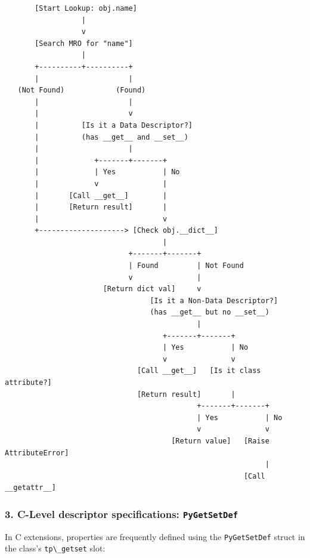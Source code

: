 \begin{lstlisting}
       [Start Lookup: obj.name]
                  |
                  v
       [Search MRO for "name"]
                  |
       +----------+----------+
       |                     |
   (Not Found)            (Found)
       |                     |
       |                     v
       |          [Is it a Data Descriptor?]
       |          (has __get__ and __set__)
       |                     |
       |             +-------+-------+
       |             | Yes           | No
       |             v               |
       |       [Call __get__]        |
       |       [Return result]       |
       |                             v
       +--------------------> [Check obj.__dict__]
                                     |
                             +-------+-------+
                             | Found         | Not Found
                             v               |
                       [Return dict val]     v
                                  [Is it a Non-Data Descriptor?]
                                  (has __get__ but no __set__)
                                             |
                                     +-------+-------+
                                     | Yes           | No
                                     v               v
                               [Call __get__]   [Is it class attribute?]
                               [Return result]       |
                                             +-------+-------+
                                             | Yes           | No
                                             v               v
                                       [Return value]   [Raise AttributeError]
                                                             |
                                                        [Call __getattr__]
\end{lstlisting}

\hypertarget{c-level-descriptor-specifications-pygetsetdef}{%
\subsubsection{\texorpdfstring{3. C-Level descriptor specifications:
\texttt{PyGetSetDef}}{3. C-Level descriptor specifications: PyGetSetDef}}\label{c-level-descriptor-specifications-pygetsetdef}}

In C extensions, properties are frequently defined using the
\passthrough{\lstinline!PyGetSetDef!} struct in the class's
\passthrough{\lstinline!tp\_getset!} slot:

